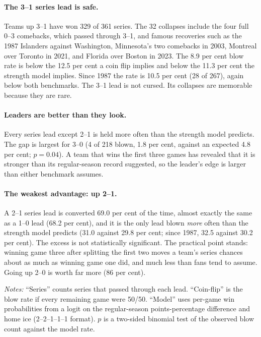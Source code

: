 \documentclass[11pt]{article}
\begin{document}
\paragraph{The 3--1 series lead is safe.} Teams up 3--1 have won 329 of 361 series. The 32 collapses include the four full 0--3 comebacks, which passed through 3--1, and famous recoveries such as the 1987 Islanders against Washington, Minnesota's two comebacks in 2003, Montreal over Toronto in 2021, and Florida over Boston in 2023. The 8.9 per cent blow rate is below the 12.5 per cent a coin flip implies and below the 11.3 per cent the strength model implies. Since 1987 the rate is 10.5 per cent (28 of 267), again below both benchmarks. The 3--1 lead is not cursed. Its collapses are memorable because they are rare.

\paragraph{Leaders are better than they look.} Every series lead except 2--1 is held more often than the strength model predicts. The gap is largest for 3--0 (4 of 218 blown, 1.8 per cent, against an expected 4.8 per cent; $p=0.04$). A team that wins the first three games has revealed that it is stronger than its regular-season record suggested, so the leader's edge is larger than either benchmark assumes.

\paragraph{The weakest advantage: up 2--1.} A 2--1 series lead is converted 69.0 per cent of the time, almost exactly the same as a 1--0 lead (68.2 per cent), and it is the only lead blown \emph{more} often than the strength model predicts (31.0 against 29.8 per cent; since 1987, 32.5 against 30.2 per cent). The excess is not statistically significant. The practical point stands: winning game three after splitting the first two moves a team's series chances about as much as winning game one did, and much less than fans tend to assume. Going up 2--0 is worth far more (86 per cent).

\begin{table}[t]\centering\small
\caption{How often series leads are blown, best-of-seven NHL playoff series}\label{tab:series}

\begin{minipage}{0.95\linewidth}\footnotesize\vspace{4pt}
\emph{Notes:} ``Series'' counts series that passed through each lead. ``Coin-flip'' is the blow rate if every remaining game were 50/50. ``Model'' uses per-game win probabilities from a logit on the regular-season points-percentage difference and home ice (2--2--1--1--1 format). $p$ is a two-sided binomial test of the observed blow count against the model rate.
\end{minipage}
\end{table}
\end{document}
